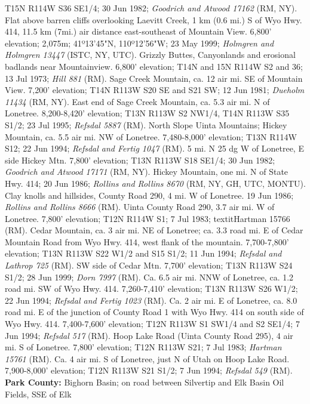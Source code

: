 T15N R114W S36 SE1/4; 30 Jun 1982; \textit{Goodrich and Atwood 17162} (RM, NY).
Flat above barren cliffs overlooking Laevitt Creek, 1 km (0.6 mi.) S of Wyo Hwy.
414, 11.5 km (7mi.) air distance east-southeast of Mountain View.
6,800' elevation; 2,075m; 41º13'45"N, 110º12'56"W; 23 May 1999;
\textit{Holmgren and Holmgren 13447} (ISTC, NY, UTC).
Grizzly Buttes, Canyonlands and erosional badlands near Mountainview.
6,800' elevation;	T14N and 15N R114W S2 and 36; 13 Jul 1973;
\textit{Hill 881} (RM).
Sage Creek Mountain, ca. 12 air mi. SE of Mountain View. 7,200' elevation;
T14N R113W S20 SE and S21 SW; 12 Jun 1981; \textit{Dueholm 11434} (RM, NY).
East end of Sage Creek Mountain, ca. 5.3 air mi. N of Lonetree.
8,200-8,420' elevation; T13N R113W S2 NW1/4, T14N R113W S35 S1/2; 23 Jul 1995;
\textit{Refsdal 5887} (RM).
North Slope Uinta Mountains; Hickey Mountain, ca. 5.5 air mi. NW of Lonetree.
7,480-8,000' elevation; T13N R114W S12; 22 Jun 1994;
\textit{Refsdal and Fertig 1047} (RM).
5 mi. N 25 dg W of Lonetree, E side Hickey Mtn. 7,800' elevation;
T13N R113W S18 SE1/4; 30 Jun 1982; \textit{Goodrich and Atwood 17171} (RM, NY).
Hickey Mountain, one mi. N of State Hwy. 414; 20 Jun 1986;
\textit{Rollins and Rollins 8670} (RM, NY, GH, UTC, MONTU).
Clay knolls and hillsides, County Road 290, 4 mi. W of Lonetree. 19 Jun 1986;
\textit{Rollins and Rollins 8666} (RM).
Uinta County Road 290, 3.7 air mi. W of Lonetree. 7,800' elevation;
T12N R114W S1; 7 Jul 1983; textit{Hartman 15766} (RM).
Cedar Mountain, ca. 3 air mi. NE of Lonetree; ca. 3.3 road mi. E of Cedar
Mountain Road from Wyo Hwy. 414, west flank of the mountain.
7,700-7,800' elevation; T13N R113W S22 W1/2 and S15 S1/2; 11 Jun 1994;
\textit{Refsdal and Lathrop 725} (RM).
SW side of Cedar Mtn. 7,700' elevation; T13N R113W S24 S1/2; 28 Jun 1999;
\textit{Dorn 7997} (RM).
Ca. 6.5 air mi. NNW of Lonetree, ca. 1.2 road mi. SW of Wyo Hwy. 414.
7,260-7,410' elevation; T13N R113W S26 W1/2; 22 Jun 1994;
\textit{Refsdal and Fertig 1023} (RM).
Ca. 2 air mi. E of Lonetree, ca. 8.0 road mi. E of the junction of County Road 1
with Wyo Hwy. 414 on south side of Wyo Hwy. 414. 7,400-7,600' elevation;
T12N R113W S1 SW1/4 and S2 SE1/4; 7 Jun 1994; \textit{Refsdal 517} (RM).
Hoop Lake Road (Uinta County Road 295), 4 air mi. S of Lonetree.
7,800' elevation; T12N R113W S21; 7 Jul 1983; \textit{Hartman 15761} (RM).
Ca. 4 air mi. S of Lonetree, just N of Utah on Hoop Lake Road.
7,900-8,000' elevation; T12N R113W S21 S1/2; 7 Jun 1994;
\textit{Refsdal 549} (RM).
  \textbf{Park County:}
Bighorn Basin; on road between Silvertip and Elk Basin Oil Fields, SSE of Elk
